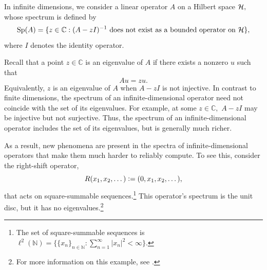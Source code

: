 In infinite dimensions, we consider a linear operator $A$ on a Hilbert space $\mathcal{H},$ whose spectrum is defined by
\begin{equation} \label{SpA}
    \operatorname{Sp}(A) = \{z \in \mathbb{C}: (A-zI)^{-1} \text{ does not exist as a bounded operator on } \mathcal{H} \},
\end{equation}
where $I$ denotes the identity operator. 

Recall that a point $z \in \mathbb{C}$ is an eigenvalue of $A$ if there exists a nonzero $u$ such that
\begin{equation}
Au=z u.
\end{equation} 
Equivalently, $z$ is an eigenvalue of $A$ when $A-z I$ is not injective. 
In contrast to finite dimensions, the spectrum of an infinite-dimensional operator need not coincide with the set of its eigenvalues. For example, at some $z \in \mathbb{C},$ $A-zI$ may be injective but not surjective. Thus, the
spectrum of an infinite-dimensional operator includes the set of its eigenvalues, but is generally much richer. 


As a result, new phenomena are present in the spectra of infinite-dimensional operators that make them much harder to reliably compute. To see this, consider the right-shift operator, 
\begin{equation}\label{right shift}
R(x_1, x_2, \dots) \vcentcolon= (0, x_1, x_2, \dots),
\end{equation}
that acts on square-summable sequences.\footnote{The set of square-summable sequences is
    $\ell^2(\mathbb{N}) = \{\{x_n\}_{n \in \mathbb{N}}: \sum_{n=1}^{\infty} |x_n|^2 < \infty\}.$} This operator's spectrum is the unit disc, but it has no eigenvalues.\footnote{For more information on this example, see .}

